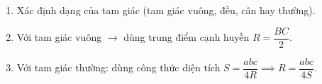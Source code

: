 \begin{enumerate}
\item Xác định dạng của tam giác (tam giác vuông, đều, cân hay thường).
\item Với tam giác vuông $\rightarrow$ dùng trung điểm cạnh huyền $R = \dfrac{BC}{2}$.
\item Với tam giác thường: dùng công thức diện tích $S = \dfrac{abc}{4R} \implies R = \dfrac{abc}{4S}$.
\end{enumerate}
